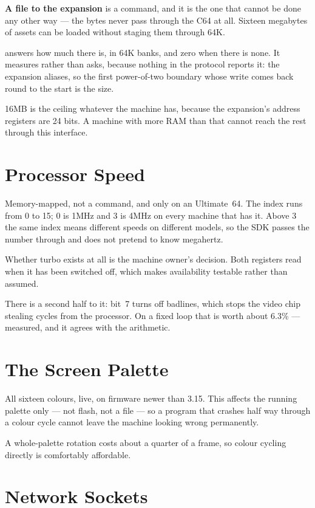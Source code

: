 \textbf{A file to the expansion} is a command, and it is the one that cannot be
done any other way --- the bytes never pass through the C64 at all. Sixteen
megabytes of assets can be loaded without staging them through 64K.

 answers how much there is, in 64K banks, and zero
when there is none. It measures rather than asks, because nothing in the
protocol reports it: the expansion aliases, so the first power-of-two boundary
whose write comes back round to the start is the size.

\begin{note}
16MB is the ceiling whatever the machine has, because the expansion's address
registers are 24 bits. A machine with more RAM than that cannot reach the rest
through this interface.
\end{note}

\section{Processor Speed}

Memory-mapped, not a command, and only on an Ultimate~64. The index runs from
0 to 15; 0 is 1MHz and 3 is 4MHz on every machine that has it. Above 3 the same
index means different speeds on different models, so the SDK passes the number
through and does not pretend to know megahertz.

Whether turbo exists at all is the machine owner's decision. Both registers
read  when it has been switched off, which makes availability
testable rather than assumed.

There is a second half to it: bit~7 turns off badlines, which stops the video
chip stealing cycles from the processor. On a fixed loop that is worth about
6.3\% --- measured, and it agrees with the arithmetic.

\section{The Screen Palette}

All sixteen colours, live, on firmware newer than 3.15. This affects the
running palette only --- not flash, not a file --- so a program that crashes
half way through a colour cycle cannot leave the machine looking wrong
permanently.

A whole-palette rotation costs about a quarter of a frame, so colour cycling
directly is comfortably affordable.

\section{Network Sockets}

